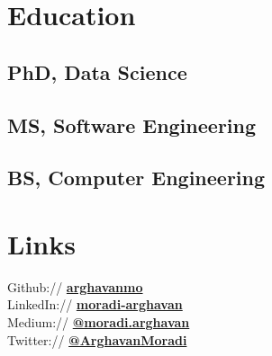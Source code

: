 \documentclass[letterpaper]{deedy-resume} %
\begin{document}
\begin{minipage}[t]{0.33\textwidth}
\section{Education} 

\subsection{PhD, Data Science}


\sectionspace %

\subsection{MS, Software Engineering}

\sectionspace %


\subsection{BS, Computer Engineering}

\sectionspace %



\section{Links} 

Github:// \href{https://github.com/arghavanmo}{\bf arghavanmo} \\
LinkedIn:// \href{https://www.linkedin.com/in/moradi-arghavan}{\bf moradi-arghavan} \\
Medium:// \href{https://medium.com/@moradi.arghavan}{\bf @moradi.arghavan} \\
Twitter:// \href{https://twitter.com/ArghavanMoradi}{\bf @ArghavanMoradi} \\

\sectionspace %


\end{minipage} %
\end{document}
